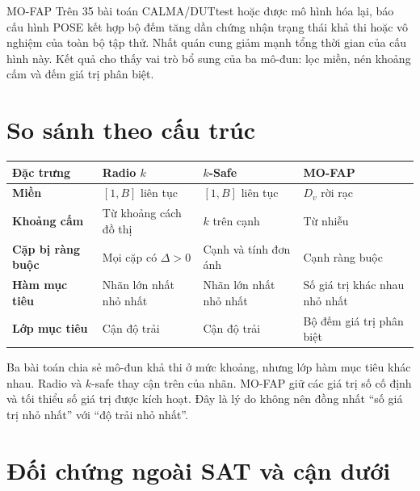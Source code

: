 \begin{resultbox}{MO-FAP}
Trên 35 bài toán CALMA/DUTtest hoặc được mô hình hóa lại,
\textcite{dao2026mofap} báo cấu hình POSE kết hợp bộ đếm tăng dần chứng nhận
trạng thái khả thi hoặc vô nghiệm của toàn bộ tập thử. Nhất quán cung
giảm mạnh tổng thời gian của cấu hình này. Kết quả cho thấy vai trò bổ sung của
ba mô-đun: lọc miền, nén khoảng cấm và đếm giá trị phân biệt.
\end{resultbox}

\section{So sánh theo cấu trúc}

\begin{center}
\label{tab:labeling-structure}
\begin{tabularx}{\textwidth}{@{}>{\bfseries\sffamily}p{}YYY@{}}
\toprule
Đặc trưng & Radio \(k\) & \(k\)-Safe & MO-FAP\\
\midrule
Miền & \([1,B]\) liên tục & \([1,B]\) liên tục & \(D_v\) rời rạc\\
Khoảng cấm & Từ khoảng cách đồ thị & \(k\) trên cạnh & Từ nhiễu\\
Cặp bị ràng buộc & Mọi cặp có \(\Delta>0\) &
Cạnh và tính đơn ánh & Cạnh ràng buộc\\
Hàm mục tiêu & Nhãn lớn nhất nhỏ nhất & Nhãn lớn nhất nhỏ nhất & Số giá trị khác nhau nhỏ nhất\\
Lớp mục tiêu & Cận độ trải & Cận độ trải & Bộ đếm giá trị phân biệt\\
\bottomrule
\end{tabularx}
\end{center}

Ba bài toán chia sẻ mô-đun khả thi ở mức khoảng, nhưng lớp hàm mục tiêu khác
nhau. Radio và \(k\)-safe thay cận trên của nhãn. MO-FAP giữ các
giá trị số cố định và tối thiểu số giá trị được kích hoạt. Đây là lý do không
nên đồng nhất ``số giá trị nhỏ nhất'' với ``độ trải nhỏ nhất''.

\section{Đối chứng ngoài SAT và cận dưới}

